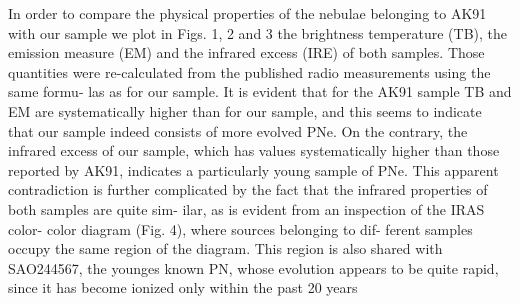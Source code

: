 \documentclass[fleqn,usenatbib]{mnras}
\begin{document}
In order to compare the physical properties of the
nebulae belonging to AK91 with our sample we plot in
Figs. 1, 2 and 3 the brightness temperature (TB), the
emission measure (EM) and the infrared excess (IRE) of
both samples. Those quantities were re-calculated from
the published radio measurements using the same formu-
las as for our sample.
It is evident that for the AK91 sample TB and EM
are systematically higher than for our sample, and this
seems to indicate that our sample indeed consists of more
evolved PNe.
On the contrary, the infrared excess of our sample, which
has values systematically higher than those reported by
AK91, indicates a particularly young sample of PNe. This
apparent contradiction is further complicated by the fact
that the infrared properties of both samples are quite sim-
ilar, as is evident from an inspection of the IRAS color-
color diagram (Fig. 4), where sources belonging to dif-
ferent samples occupy the same region of the diagram.
This region is also shared with SAO244567, the younges
known PN, whose evolution appears to be quite rapid,
since it has become ionized only within the past 20 years
\end{document}
